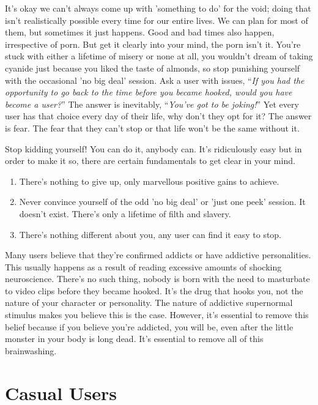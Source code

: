\documentclass[
]{book}
\begin{document}
It's okay we can't always come up with 'something to do' for the void; doing that isn't realistically possible every time for our entire lives. We can plan for most of them, but sometimes it just happens. Good and bad times also happen, irrespective of porn. But get it clearly into your mind, the porn isn't it. You're stuck with either a lifetime of misery or none at all, you wouldn't dream of taking cyanide just because you liked the taste of almonds, so stop punishing yourself with the occasional 'no big deal' session. Ask a user with issues, ``\emph{If you had the opportunity to go back to the time before you became hooked, would you have become a user?}'' The answer is inevitably, ``\emph{You've got to be joking!}'' Yet every user has that choice every day of their life, why don't they opt for it? The answer is fear. The fear that they can't stop or that life won't be the same without it.

Stop kidding yourself! You can do it, anybody can. It's ridiculously easy but in order to make it so, there are certain fundamentals to get clear in your mind.

\begin{enumerate}
\def\labelenumi{\arabic{enumi}.}
\item
  There's nothing to give up, only marvellous positive gains to achieve.
\item
  Never convince yourself of the odd 'no big deal' or 'just one peek' session. It doesn't exist. There's only a lifetime of filth and slavery.
\item
  There's nothing different about you, any user can find it easy to stop.
\end{enumerate}

Many users believe that they're confirmed addicts or have addictive personalities. This usually happens as a result of reading excessive amounts of shocking neuroscience. There's no such thing, nobody is born with the need to masturbate to video clips before they became hooked. It's the drug that hooks you, not the nature of your character or personality. The nature of addictive supernormal stimulus makes you believe this is the case. However, it's essential to remove this belief because if you believe you're addicted, you will be, even after the little monster in your body is long dead. It's essential to remove all of this brainwashing.

\hypertarget{casual-users}{%
\chapter{Casual Users}\label{casual-users}}
\end{document}
